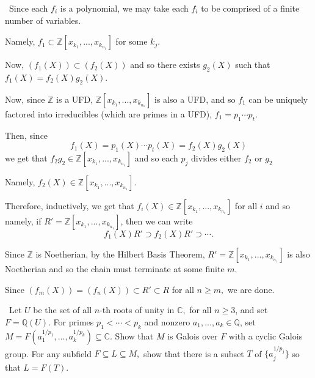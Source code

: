\documentclass[12pt]{Qual}
\begin{document}
\begin{solution}$\,$
Since each $f_i$ is a polynomial, we may take each $f_i$ to be comprised of a finite number of variables.

Namely, $f_1\subset\mathbb{Z}[x_{k_1},...,x_{k_{n_1}}]$ for some $k_j$.

Now, $(f_1(X))\subset(f_2(X))$ and so there exists $g_2(X)$ such that $f_1(X)=f_2(X)g_2(X)$. %

Now, since $\mathbb{Z}$ is a UFD, $\mathbb{Z}[x_{k_1},...,x_{k_{n_1}}]$ is also a UFD, and so $f_1$ can be uniquely factored into irreducibles (which are primes in a UFD), $f_1=p_1\cdots p_t$.

Then, since $$f_1(X)=p_1(X)\cdots p_t(X)=f_2(X)g_2(X)$$ we get that $f_2g_2\in\mathbb{Z}[x_{k_1},...,x_{k_{n_1}}]$ and so each $p_j$ divides either $f_2$ or $g_2$

Namely, $f_2(X)\in\mathbb{Z}[x_{k_1},...,x_{k_{n_1}}]$.

Therefore, inductively, we get that $f_i(X)\in\mathbb{Z}[x_{k_1},...,x_{k_{n_1}}]$ for all $i$ and so namely, if $R'=\mathbb{Z}[x_{k_1},...,x_{k_{n_1}}]$, then we can write $$f_1(X)R'\supset f_2(X)R'\supset\cdots.$$

Since $\mathbb{Z}$ is Noetherian, by the Hilbert Basis Theorem, $R'=\mathbb{Z}[x_{k_1},...,x_{k_{n_1}}]$ is also Noetherian and so the chain must terminate at some finite $m.$

Since $(f_m(X))=(f_n(X))\subset R'\subset R$ for all $n\ge m,$ we are done.
\end{solution}
\newpage



\begin{problem} $\,$
Let $U$ be the set of all $n$-th roots of unity in $\mathbb{C},$ for all $n\ge3$, and set $F=\mathbb{Q}(U)$. For primes $p_1<\cdots<p_k$ and nonzero $a_1,...,a_k\in\mathbb{Q}$, set $M=F(a_1^{1/p_1},...,a_k^{1/p_k})\subseteq\mathbb{C}$. Show that $M$ is Galois over $F$ with a cyclic Galois group. For any subfield $F\subseteq L\subseteq M,$ show that there is a subset $T$ of $\{a_j^{1/p_j}\}$ so that $L=F(T).$
\end{problem}
\end{document}
